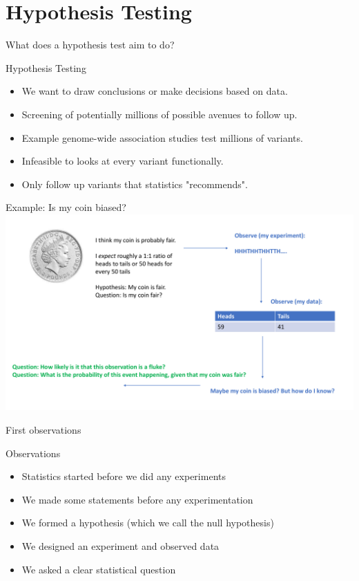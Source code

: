 \documentclass{bredelebeamer}
\begin{document}
\section{Hypothesis Testing}
\begin{frame}{What does a hypothesis test aim to do?}
\begin{block}{Hypothesis Testing}
	\begin{itemize}
	\item We want to draw conclusions or make decisions based on data.
	\item Screening of potentially millions of possible avenues to follow up.
	\item Example genome-wide association studies test millions of variants.
	\item Infeasible to looks at every variant functionally.
	\item Only follow up variants that statistics "recommends". 
	\end{itemize}  
\end{block}
\end{frame}

\begin{frame}{Example: Is my coin biased?}
 \includegraphics[width=1\textwidth]{cointoss.pdf}
\end{frame}

\begin{frame}{First observations}
\begin{block}{Observations}
	\begin{itemize}
		\item Statistics started before we did any experiments
		\item We made some statements before any experimentation
		\item We formed a hypothesis (which we call the null hypothesis)
		\item We designed an experiment and observed data
		\item We asked a clear statistical question
	\end{itemize}
\end{block}
\end{frame}
\end{document}
